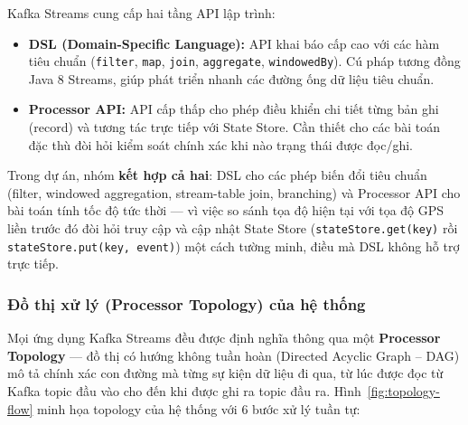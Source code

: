Kafka Streams cung cấp hai tầng API lập trình:
\begin{itemize}
    \item \textbf{DSL (Domain-Specific Language):} API khai báo cấp cao với các hàm tiêu chuẩn (\texttt{filter}, \texttt{map}, \texttt{join}, \texttt{aggregate}, \texttt{windowedBy}). Cú pháp tương đồng Java 8 Streams, giúp phát triển nhanh các đường ống dữ liệu tiêu chuẩn.
    \item \textbf{Processor API:} API cấp thấp cho phép điều khiển chi tiết từng bản ghi (record) và tương tác trực tiếp với State Store. Cần thiết cho các bài toán đặc thù đòi hỏi kiểm soát chính xác khi nào trạng thái được đọc/ghi.
\end{itemize}

Trong dự án, nhóm \textbf{kết hợp cả hai}: DSL cho các phép biến đổi tiêu chuẩn (filter, windowed aggregation, stream-table join, branching) và Processor API cho bài toán tính tốc độ tức thời — vì việc so sánh tọa độ hiện tại với tọa độ GPS liền trước đó đòi hỏi truy cập và cập nhật State Store (\texttt{stateStore.get(key)} rồi \texttt{stateStore.put(key, event)}) một cách tường minh, điều mà DSL không hỗ trợ trực tiếp.

\subsubsection{Đồ thị xử lý (Processor Topology) của hệ thống}
\label{sec:topology}

Mọi ứng dụng Kafka Streams đều được định nghĩa thông qua một \textbf{Processor Topology} — đồ thị có hướng không tuần hoàn (Directed Acyclic Graph -- DAG) mô tả chính xác con đường mà từng sự kiện dữ liệu đi qua, từ lúc được đọc từ Kafka topic đầu vào cho đến khi được ghi ra topic đầu ra. Hình~\ref{fig:topology-flow} minh họa topology của hệ thống với 6 bước xử lý tuần tự:

